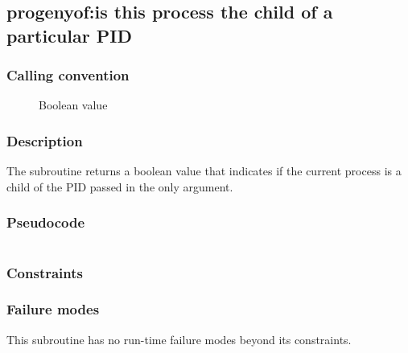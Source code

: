 \clearpage
{}
{}
\label{subr:progenyof}
\subsection*{progenyof:is this process the child of a particular PID}

\subsubsection*{Calling convention}

\begin{description}
\item[] Boolean value
\end{description}

\subsubsection*{Description}

The  subroutine returns a boolean value that
indicates if the current process is a child of the PID passed in the
only argument.
\subsubsection*{Pseudocode}

\begin{verbatim}
\end{verbatim}

\subsubsection*{Constraints}

\subsubsection*{Failure modes}

This subroutine has no run-time failure modes beyond its constraints.
